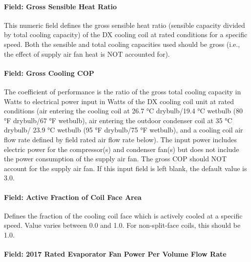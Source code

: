\paragraph{Field: Gross Sensible Heat Ratio}\label{field-gross-sensible-heat-ratio}

This numeric field defines the gross sensible heat ratio (sensible capacity divided by total cooling capacity) of the DX cooling coil at rated conditions for a specific speed. Both the sensible and total cooling capacities used should be gross (i.e., the effect of supply air fan heat is NOT accounted for).

\paragraph{Field: Gross Cooling COP}

The coefficient of performance is the ratio of the gross total cooling capacity in Watts to electrical power input in Watts of the DX cooling coil unit at rated conditions (air entering the cooling coil at 26.7 °C drybulb/19.4 °C wetbulb (80 °F drybulb/67 °F wetbulb), air entering the outdoor condenser coil at 35 °C drybulb/ 23.9 °C wetbulb (95 °F drybulb/75 °F wetbulb), and a cooling coil air flow rate defined by field rated air flow rate below). The input power includes electric power for the compressor(s) and condenser fan(s) but does not include the power consumption of the supply air fan. The gross COP should NOT account for the supply air fan. If this input field is left blank, the default value is 3.0.

\paragraph{Field: Active Fraction of Coil Face Area}\label{field-active-fraction-of-coil-face-area}

Defines the fraction of the cooling coil face which is actively cooled at a specific speed. Value varies between 0.0 and 1.0. For non-split-face coils, this should be 1.0.

\paragraph{Field: 2017 Rated Evaporator Fan Power Per Volume Flow Rate}

